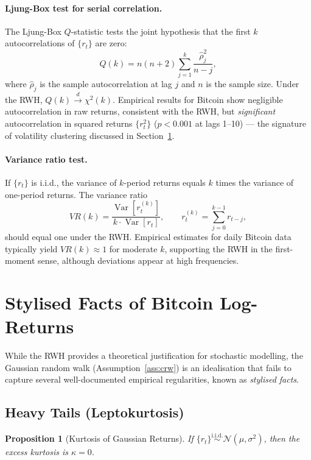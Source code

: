 \documentclass[12pt, a4paper, oneside]{report}
\theoremstyle{plain}
\newtheorem{proposition}[theorem]{Proposition}
\theoremstyle{definition}
\theoremstyle{remark}
\newcommand{\Var}{\operatorname{Var}}
\begin{document}
\paragraph{Ljung-Box test for serial correlation.}
The Ljung-Box $Q$-statistic tests the joint hypothesis that the first $k$
autocorrelations of $\{r_t\}$ are zero:
\[
  Q(k) = n(n+2)\sum_{j=1}^{k} \frac{\hat{\rho}_j^2}{n - j},
\]
where $\hat{\rho}_j$ is the sample autocorrelation at lag $j$ and $n$ is the
sample size.  Under the RWH, $Q(k) \overset{d}{\to} \chi^2(k)$.
Empirical results for Bitcoin show negligible autocorrelation in raw returns,
consistent with the RWH, but \emph{significant} autocorrelation in squared
returns $\{r_t^2\}$ ($p < 0.001$ at lags 1--10) --- the signature of
volatility clustering discussed in Section~\ref{sec:stylised}.

\paragraph{Variance ratio test.}
If $\{r_t\}$ is i.i.d., the variance of $k$-period returns equals $k$ times the
variance of one-period returns.  The variance ratio
\[
  VR(k) = \frac{\Var[r_t^{(k)}]}{k \cdot \Var[r_t]}, \qquad
  r_t^{(k)} = \sum_{j=0}^{k-1} r_{t-j},
\]
should equal one under the RWH.  Empirical estimates for daily Bitcoin data
typically yield $VR(k) \approx 1$ for moderate $k$, supporting the RWH in the
first-moment sense, although deviations appear at high frequencies.

\section{Stylised Facts of Bitcoin Log-Returns}
\label{sec:stylised}

While the RWH provides a theoretical justification for stochastic modelling,
the Gaussian random walk (Assumption~\ref{ass:crw}) is an idealisation that fails
to capture several well-documented empirical regularities, known as
\emph{stylised facts}.

\subsection{Heavy Tails (Leptokurtosis)}

\begin{proposition}[Kurtosis of Gaussian Returns]
If $\{r_t\} \overset{\text{i.i.d.}}{\sim} \mathcal{N}(\mu, \sigma^2)$, then the
excess kurtosis is $\kappa = 0$.
\end{proposition}
\end{document}
